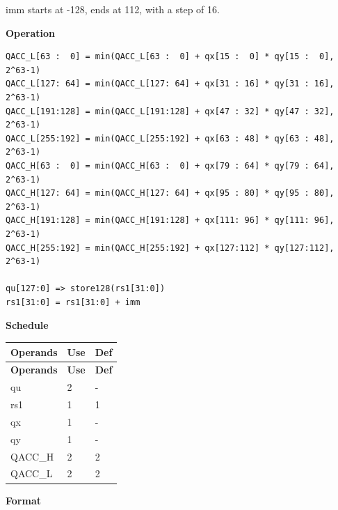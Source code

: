 imm starts at -128, ends at 112, with a step of 16.

\textbf{Operation}\\
\begin{lstlisting}
QACC_L[63 :  0] = min(QACC_L[63 :  0] + qx[15 :  0] * qy[15 :  0], 2^63-1)
QACC_L[127: 64] = min(QACC_L[127: 64] + qx[31 : 16] * qy[31 : 16], 2^63-1)
QACC_L[191:128] = min(QACC_L[191:128] + qx[47 : 32] * qy[47 : 32], 2^63-1)
QACC_L[255:192] = min(QACC_L[255:192] + qx[63 : 48] * qy[63 : 48], 2^63-1)
QACC_H[63 :  0] = min(QACC_H[63 :  0] + qx[79 : 64] * qy[79 : 64], 2^63-1)
QACC_H[127: 64] = min(QACC_H[127: 64] + qx[95 : 80] * qy[95 : 80], 2^63-1)
QACC_H[191:128] = min(QACC_H[191:128] + qx[111: 96] * qy[111: 96], 2^63-1)
QACC_H[255:192] = min(QACC_H[255:192] + qx[127:112] * qy[127:112], 2^63-1)

qu[127:0] => store128(rs1[31:0])
rs1[31:0] = rs1[31:0] + imm
\end{lstlisting}

\textbf{Schedule}\\
\begin{longtable}[c]{|l|l|l|}
    \hline
    \rowcolor{lightgray}
    \textbf{Operands} & \textbf{Use} & \textbf{Def} \\\hline
    \endfirsthead
    \hline
    \rowcolor{lightgray}
     \textbf{Operands} & \textbf{Use} & \textbf{Def} \\\hline
    \endhead
    \hline
    \endfoot

    qu & 2 & - \\\hline
    rs1 & 1 & 1 \\\hline
     qx & 1 & - \\\hline
     qy & 1 & - \\\hline
     QACC\_H & 2 & 2 \\\hline
     QACC\_L & 2 & 2

\end{longtable}

\textbf{Format}\\

